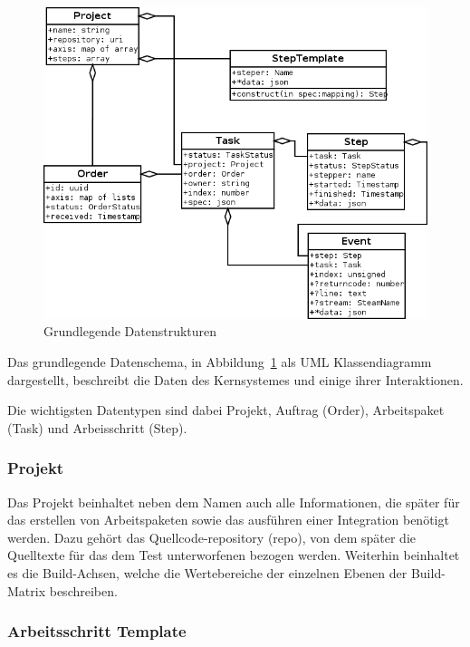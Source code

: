 \begin{figure}[ht] 
  \centering
  \label{fig:datenstrukturen}
  \includegraphics[width=\textwidth]{imageinput/datenstrukturen-step-templates.png}
  \caption{Grundlegende Datenstrukturen}
\end{figure}

Das grundlegende Datenschema, in Abbildung~\ref{fig:datenstrukturen} als UML Klassendiagramm dargestellt,
beschreibt die Daten des Kernsystemes und einige ihrer Interaktionen.

Die wichtigsten Datentypen sind dabei Projekt, Auftrag (Order), Arbeitspaket (Task) und Arbeisschritt (Step).

\subsubsection{Projekt}

Das Projekt beinhaltet neben dem Namen auch alle Informationen,
die sp\"ater f\"ur das erstellen von Arbeitspaketen sowie
das ausf\"uhren einer Integration ben\"otigt werden.
Dazu geh\"ort das Quellcode-repository (repo), von dem sp\"ater
die Quelltexte f\"ur das dem Test unterworfenen bezogen werden.
Weiterhin beinhaltet es die Build-Achsen,
welche die Wertebereiche der einzelnen Ebenen der Build-Matrix
beschreiben.

\subsubsection{Arbeitsschritt Template}

